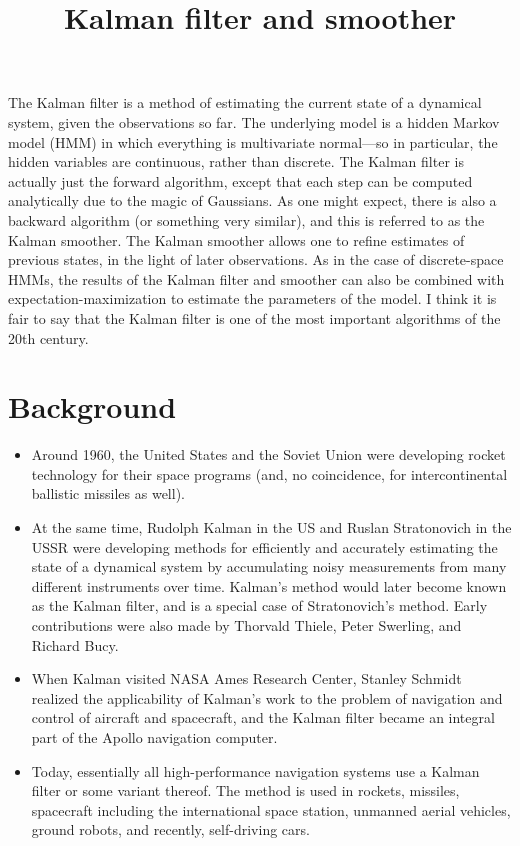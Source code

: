 \documentclass[12pt]{article}
\title{Kalman filter and smoother}
\author{}
\date{}
\begin{document}
\maketitle
\tableofcontents
\thispagestyle{firststyle}


\vspace{2em}


The Kalman filter is a method of estimating the current state of a dynamical system, given the observations so far. The underlying model is a hidden Markov model (HMM) in which everything is multivariate normal---so in particular, the hidden variables are continuous, rather than discrete. The Kalman filter is actually just the forward algorithm, except that each step can be computed analytically due to the magic of Gaussians. As one might expect, there is also a backward algorithm (or something very similar), and this is referred to as the Kalman smoother.  The Kalman smoother allows one to refine estimates of previous states, in the light of later observations. As in the case of discrete-space HMMs, the results of the Kalman filter and smoother can also be combined with expectation-maximization to estimate the parameters of the model. I think it is fair to say that the Kalman filter is one of the most important algorithms of the 20th century.

\newpage

\section{Background}

\begin{itemize}
\item Around 1960, the United States and the Soviet Union were developing rocket technology for their space programs (and, no coincidence, for intercontinental ballistic missiles as well).
\item At the same time, Rudolph Kalman in the US and Ruslan Stratonovich in the USSR were developing methods for efficiently and accurately estimating the state of a dynamical system by accumulating noisy measurements from many different instruments over time. Kalman's method would later become known as the Kalman filter, and is a special case of Stratonovich's method.  Early contributions were also made by Thorvald Thiele, Peter Swerling, and Richard Bucy.
\item When Kalman visited NASA Ames Research Center, Stanley Schmidt realized the applicability of Kalman's work to the problem of navigation and control of aircraft and spacecraft, and the Kalman filter became an integral part of the Apollo navigation computer.
\item Today, essentially all high-performance navigation systems use a Kalman filter or some variant thereof.  The method is used in rockets, missiles, spacecraft including the international space station, unmanned aerial vehicles, ground robots, and recently, self-driving cars.
\end{itemize}
\end{document}
